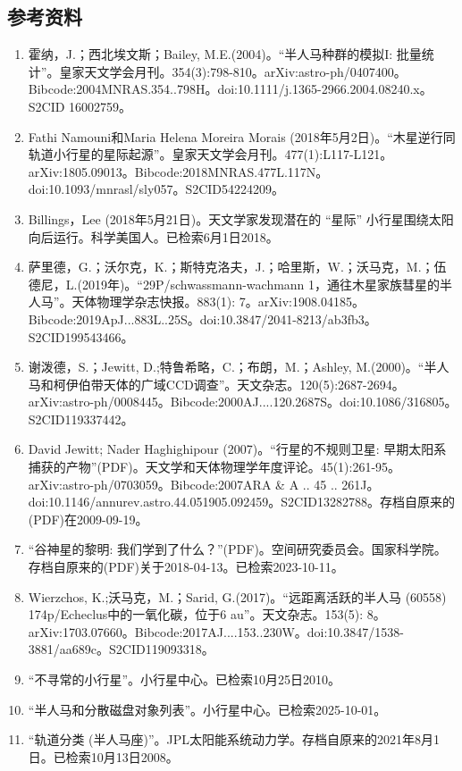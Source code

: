 \subsection{参考资料}
\begin{enumerate}
\item 霍纳，J.；西北埃文斯；Bailey, M.E.(2004)。“半人马种群的模拟I: 批量统计”。皇家天文学会月刊。354(3):798-810。arXiv:astro-ph/0407400。Bibcode:2004MNRAS.354..798H。doi:10.1111/j.1365-2966.2004.08240.x。S2CID 16002759。
\item Fathi Namouni和Maria Helena Moreira Morais (2018年5月2日)。“木星逆行同轨道小行星的星际起源”。皇家天文学会月刊。477(1):L117-L121。arXiv:1805.09013。Bibcode:2018MNRAS.477L.117N。doi:10.1093/mnrasl/sly057。S2CID54224209。  
\item Billings，Lee (2018年5月21日)。天文学家发现潜在的 “星际” 小行星围绕太阳向后运行。科学美国人。已检索6月1日2018。
\item 萨里德，G.；沃尔克，K.；斯特克洛夫，J.；哈里斯，W.；沃马克，M.；伍德尼，L.(2019年)。“29P/schwassmann-wachmann 1，通往木星家族彗星的半人马”。天体物理学杂志快报。883(1): 7。arXiv:1908.04185。Bibcode:2019ApJ...883L..25S。doi:10.3847/2041-8213/ab3fb3。S2CID199543466。 
\item 谢泼德，S.；Jewitt, D.;特鲁希略，C.；布朗，M.；Ashley, M.(2000)。“半人马和柯伊伯带天体的广域CCD调查”。天文杂志。120(5):2687-2694。arXiv:astro-ph/0008445。Bibcode:2000AJ....120.2687S。doi:10.1086/316805。S2CID119337442。 
\item David Jewitt; Nader Haghighipour (2007)。“行星的不规则卫星: 早期太阳系捕获的产物”(PDF)。天文学和天体物理学年度评论。45(1):261-95。arXiv:astro-ph/0703059。Bibcode:2007ARA & A .. 45 .. 261J。doi:10.1146/annurev.astro.44.051905.092459。S2CID13282788。存档自原来的(PDF)在2009-09-19。  
\item “谷神星的黎明: 我们学到了什么？”(PDF)。空间研究委员会。国家科学院。存档自原来的(PDF)关于2018-04-13。已检索2023-10-11。
\item Wierzchos, K.;沃马克，M.；Sarid, G.(2017)。“远距离活跃的半人马 (60558) 174p/Echeclus中的一氧化碳，位于6 au”。天文杂志。153(5): 8。arXiv:1703.07660。Bibcode:2017AJ....153..230W。doi:10.3847/1538-3881/aa689c。S2CID119093318。 
\item “不寻常的小行星”。小行星中心。已检索10月25日2010。
\item “半人马和分散磁盘对象列表”。小行星中心。已检索2025-10-01。
\item “轨道分类 (半人马座)”。JPL太阳能系统动力学。存档自原来的2021年8月1日。已检索10月13日2008。

\end{enumerate}
